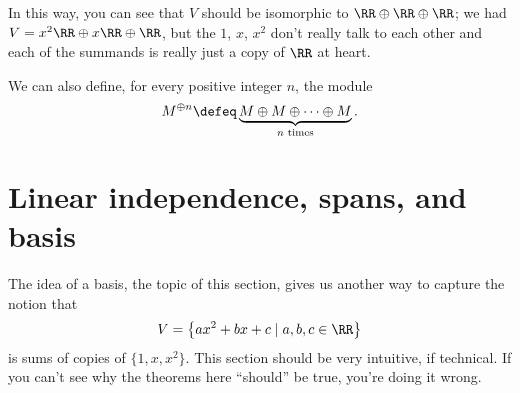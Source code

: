 In this way, you can see that $V$ should be isomorphic
to $\RR \oplus \RR \oplus \RR$;
we had $V = x^2\RR \oplus x\RR \oplus \RR$,
but the $1$, $x$, $x^2$ don't really talk to each other
and each of the summands is really just a copy of $\RR$ at heart.

\begin{definition}
	We can also define, for every positive integer $n$, the module
	\[ M^{\oplus n}
		\defeq \underbrace{M \oplus M \oplus \dots \oplus M}_{\text{$n$ times}}. \]
\end{definition}

\section{Linear independence, spans, and basis}

The idea of a basis, the topic of this section,
gives us another way to capture the notion that
\[ V = \left\{ ax^2+bx+c \mid a,b,c \in \RR \right\} \]
is sums of copies of $\{1,x,x^2\}$.
This section should be very intuitive, if technical.
If you can't see why the theorems here ``should'' be true,
you're doing it wrong.

